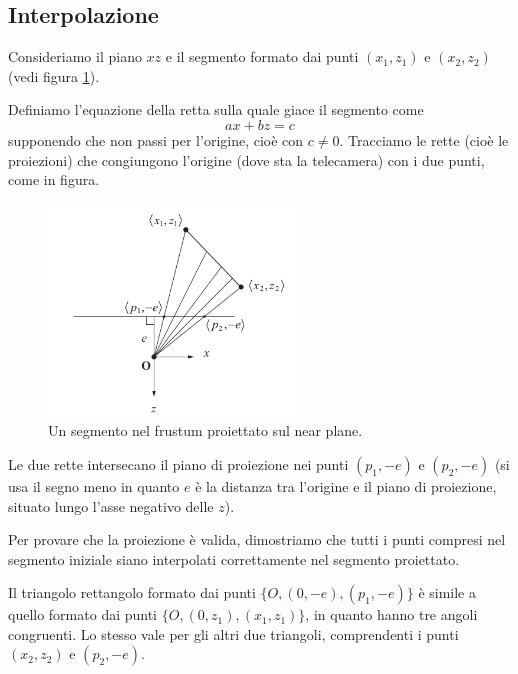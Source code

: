\subsection{Interpolazione}

Consideriamo il piano $xz$ e il segmento formato dai punti $(x_1,z_1)$  e $(x_2,z_2)$ (vedi figura \ref{segment}).

Definiamo l'equazione della retta sulla quale giace il segmento come $$ax+bz=c$$ supponendo che non passi per l'origine, cioè con $c\ne0$. Tracciamo le rette (cioè le proiezioni) che congiungono l'origine (dove sta la telecamera) con i due punti, come in figura.

\begin{figure}[htbp]
\centering
\includegraphics[width=0.6\textwidth]{images/frustum/segment-xz.png}
\caption{Un segmento nel frustum proiettato sul near plane.\label{segment}}
\end{figure}

Le due rette intersecano il piano di proiezione nei punti $(p_1,-e)$ e $(p_2,-e)$ (si usa il segno meno in quanto $e$ è la distanza tra l'origine e il piano di proiezione, situato lungo l'asse negativo delle $z$).

Per provare che la proiezione è valida, dimostriamo che tutti i punti compresi nel segmento iniziale siano interpolati correttamente nel segmento proiettato.

Il triangolo rettangolo formato dai punti $\{O,(0,-e),(p_1,-e)\}$ è simile a quello formato dai punti $\{O,(0,z_1),(x_1,z_1)\}$, in quanto hanno tre angoli congruenti. Lo stesso vale per gli altri due triangoli, comprendenti i punti $(x_2,z_2)$ e $(p_2,-e)$.

